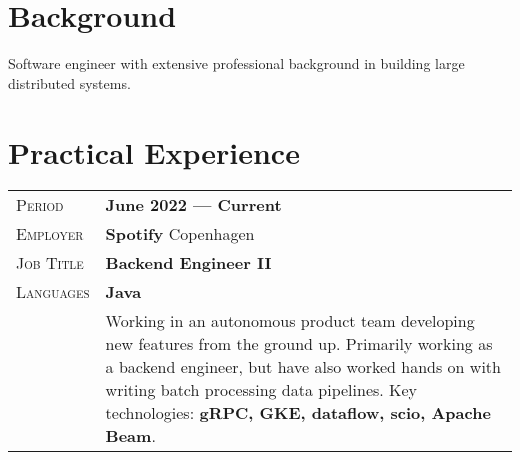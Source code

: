 \documentclass[a4paper, oneside, final]{scrartcl} %
\newcommand{\gray}{\rowcolor[gray]{.90}} %
\begin{document}
\begin{center} %


{\fontsize{36}{36}\selectfont\scshape{}} %

\vspace{1.5cm} %


\section{Background}

Software engineer with extensive professional background in building large distributed systems.


\section{Practical Experience}

\begin{tabularx}{0.97\linewidth}{>{\raggedleft\scshape}p{2cm}X}
\gray Period & \textbf{June 2022 --- Current}\\
\gray Employer & \textbf{Spotify} \hfill Copenhagen\\
\gray Job Title & \textbf{Backend Engineer II}\\
\gray Languages & \textbf{Java}\\
       &  Working in an autonomous product team developing new features from the ground up. Primarily working as a backend engineer, but have also worked hands on with writing batch processing data pipelines. Key technologies: \textbf{gRPC, GKE, dataflow, scio, Apache Beam}.
\end{tabularx}

\vspace{12pt}


\end{center}
\end{document}
